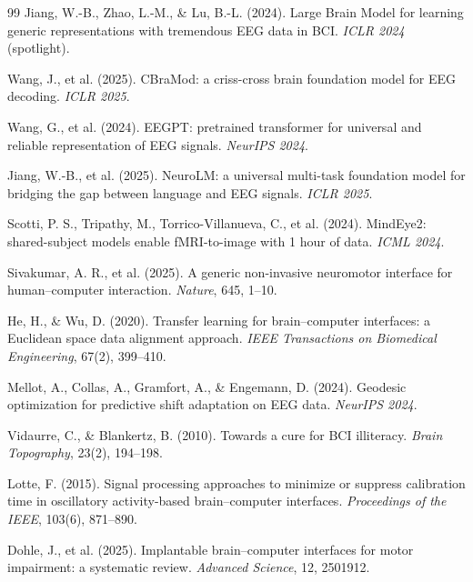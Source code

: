 \documentclass{article}
\begin{document}
\begin{thebibliography}{99}
Jiang, W.-B., Zhao, L.-M., \& Lu, B.-L. (2024). Large Brain Model for learning generic representations with tremendous EEG data in BCI. \textit{ICLR 2024} (spotlight).

Wang, J., et al. (2025). CBraMod: a criss-cross brain foundation model for EEG decoding. \textit{ICLR 2025}.

Wang, G., et al. (2024). EEGPT: pretrained transformer for universal and reliable representation of EEG signals. \textit{NeurIPS 2024}.

Jiang, W.-B., et al. (2025). NeuroLM: a universal multi-task foundation model for bridging the gap between language and EEG signals. \textit{ICLR 2025}.

Scotti, P. S., Tripathy, M., Torrico-Villanueva, C., et al. (2024). MindEye2: shared-subject models enable fMRI-to-image with 1 hour of data. \textit{ICML 2024}.

Sivakumar, A. R., et al. (2025). A generic non-invasive neuromotor interface for human--computer interaction. \textit{Nature}, 645, 1--10.

He, H., \& Wu, D. (2020). Transfer learning for brain--computer interfaces: a Euclidean space data alignment approach. \textit{IEEE Transactions on Biomedical Engineering}, 67(2), 399--410.

Mellot, A., Collas, A., Gramfort, A., \& Engemann, D. (2024). Geodesic optimization for predictive shift adaptation on EEG data. \textit{NeurIPS 2024}.

Vidaurre, C., \& Blankertz, B. (2010). Towards a cure for BCI illiteracy. \textit{Brain Topography}, 23(2), 194--198.

Lotte, F. (2015). Signal processing approaches to minimize or suppress calibration time in oscillatory activity-based brain--computer interfaces. \textit{Proceedings of the IEEE}, 103(6), 871--890.

Dohle, J., et al. (2025). Implantable brain--computer interfaces for motor impairment: a systematic review. \textit{Advanced Science}, 12, 2501912.

\end{thebibliography}
\end{document}
